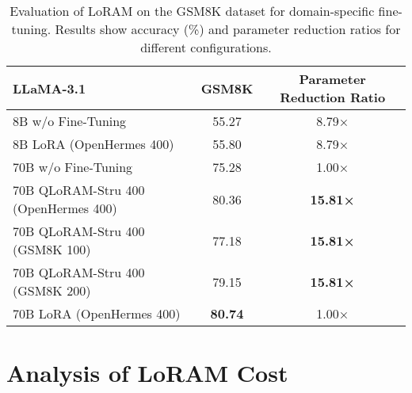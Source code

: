 \begin{table}[ht]
    \centering
    \caption{{Evaluation of LoRAM on the GSM8K dataset for domain-specific fine-tuning. Results show accuracy (\%) and parameter reduction ratios for different configurations.}}
    \label{tab:gsm8k_results}
    {
    \begin{tabular}{@{}lcc@{}}
        \toprule
        \textbf{LLaMA-3.1} & \textbf{GSM8K} & \textbf{Parameter Reduction Ratio} \\
        \midrule
        8B w/o Fine-Tuning            & 55.27  & 8.79× \\
        8B LoRA (OpenHermes 400)      & 55.80  & 8.79× \\
        70B w/o Fine-Tuning           & 75.28  & 1.00× \\
        70B QLoRAM-Stru 400 (OpenHermes 400) & 80.36 & \textbf{15.81×} \\
        70B QLoRAM-Stru 400 (GSM8K 100) & 77.18 & \textbf{15.81×} \\
        70B QLoRAM-Stru 400 (GSM8K 200) & 79.15 & \textbf{15.81×} \\
        70B LoRA (OpenHermes 400)     & \textbf{80.74} & 1.00× \\
        \bottomrule
    \end{tabular}}
\end{table}

\clearpage
\section{{Analysis of LoRAM Cost}}
\label{apd:diverse_metrics}

